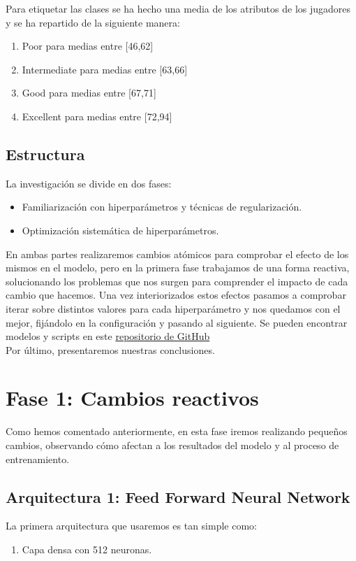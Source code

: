 \documentclass{article}
\begin{document}
	Para etiquetar las clases se ha hecho una media de los atributos de los jugadores y se ha repartido de la siguiente manera: 
	\begin{enumerate}
		\item Poor para medias entre [46,62]
    	\item Intermediate para medias entre [63,66]
    	\item Good para medias entre [67,71]
    	\item Excellent para medias entre [72,94]
	\end{enumerate}
	
	\subsection{Estructura}
		La investigaci\'on se divide en dos fases:
		\begin{itemize}
			\item Familiarizaci\'on con hiperpar\'ametros y t\'ecnicas de regularizaci\'on.
			\item Optimizaci\'on sistem\'atica de hiperpar\'ametros.
		\end{itemize}
		
		En ambas partes realizaremos cambios at\'omicos para comprobar el efecto de los mismos en el modelo, pero en la primera fase trabajamos de una forma reactiva, solucionando los problemas que nos surgen para comprender el impacto de cada cambio que hacemos. Una vez interiorizados estos efectos pasamos a comprobar iterar sobre distintos valores para cada hiperpar\'ametro y nos quedamos con el mejor, fij\'andolo en la configuraci\'on y pasando al siguiente. Se pueden encontrar modelos y scripts en este \href{https://github.com/Dacarpe03/FIFAPlayersClassification}{repositorio de GitHub}\\
		
		Por \'ultimo, presentaremos nuestras conclusiones.
		
\section{Fase 1: Cambios reactivos}
	Como hemos comentado anteriormente, en esta fase iremos realizando peque\~nos cambios, observando c\'omo afectan a los resultados del modelo y al proceso de entrenamiento.
	\subsection{Arquitectura 1: Feed Forward Neural Network}
	\label{d-s-a1}
		La primera arquitectura que usaremos es tan simple como:
		\begin{enumerate}
			\item Capa densa con 512 neuronas.
		\end{enumerate}
\end{document}
